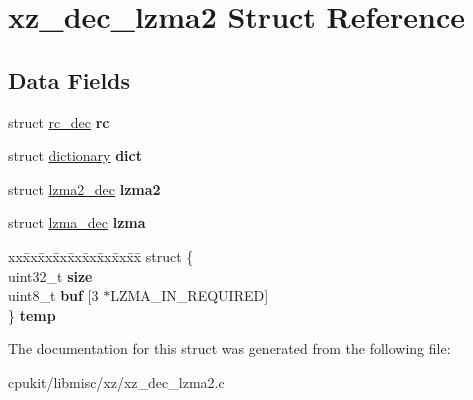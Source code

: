 \hypertarget{structxz__dec__lzma2}{}\section{xz\+\_\+dec\+\_\+lzma2 Struct Reference}
\label{structxz__dec__lzma2}
\subsection*{Data Fields}
\begin{DoxyCompactItemize}
\item 
\mbox{\label{structxz__dec__lzma2_ab2a56c2545fe04a3dd0e514f273bcccb}} 
struct \mbox{\hyperlink{structrc__dec}{rc\+\_\+dec}} {\bfseries rc}
\item 
\mbox{\label{structxz__dec__lzma2_a53d8d9818574b374a9c1accb601f1f6f}} 
struct \mbox{\hyperlink{structdictionary}{dictionary}} {\bfseries dict}
\item 
\mbox{\label{structxz__dec__lzma2_a4bcf961b2ee7d7a591f34791be1b6c53}} 
struct \mbox{\hyperlink{structlzma2__dec}{lzma2\+\_\+dec}} {\bfseries lzma2}
\item 
\mbox{\label{structxz__dec__lzma2_af6a6f9205250fc89eaf65b883e9a0d61}} 
struct \mbox{\hyperlink{structlzma__dec}{lzma\+\_\+dec}} {\bfseries lzma}
\item 
\mbox{\label{structxz__dec__lzma2_aaeaffa3047793f50b9f9a1a5d2fa2c13}} 
\begin{tabbing}
xx\=xx\=xx\=xx\=xx\=xx\=xx\=xx\=xx\=\kill
struct \{\\
\>uint32\_t {\bfseries size}\\
\>uint8\_t {\bfseries buf} \mbox{[}3 $\ast$LZMA\_IN\_REQUIRED\mbox{]}\\
\} {\bfseries temp}\\

\end{tabbing}\end{DoxyCompactItemize}


The documentation for this struct was generated from the following file\+:\begin{DoxyCompactItemize}
\item 
cpukit/libmisc/xz/xz\+\_\+dec\+\_\+lzma2.\+c\end{DoxyCompactItemize}
